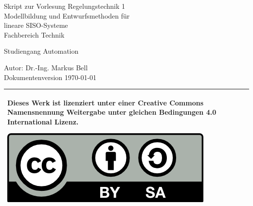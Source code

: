 
\thispagestyle{empty}
%
\vspace*{0cm}
%
\begin{center}
    \Huge{Skript zur Vorlesung Regelungstechnik 1\\}
    \vspace{1.5cm}
    \Large{Modellbildung und Entwurfsmethoden f\"ur\\lineare SISO-Systeme\\}
	\setlength{\parskip}{8pt}
    \normalsize
    \vspace{1.0cm}
    Fachbereich Technik \par
    Studiengang Automation
 \end{center}
 \vspace{3.5cm}
 \begin{center}
 Autor: Dr.-Ing. Markus Bell\\
 Dokumentenversion \today
 \end{center}
  \begin{center}
  \begin{tabular}{|p{}|}
 	\hline
	Dieses Werk ist lizenziert unter einer Creative Commons Namensnennung Weitergabe unter gleichen Bedingungen 4.0 International Lizenz.
 	\begin{center}
 		\includegraphics[scale=1]{Logo/by-sa}
 	\end{center}\\
 	\hline
   \end{tabular}
   \end{center}
\setlength{\parskip}{0pt}

\cleardoublepage